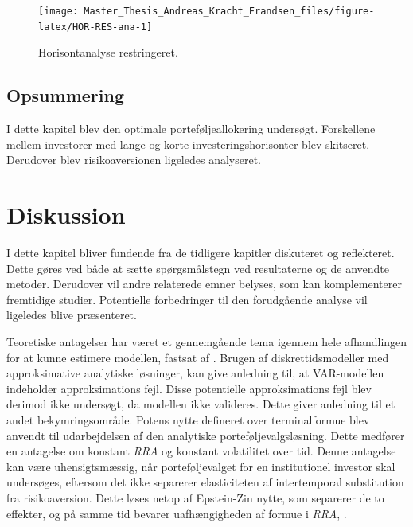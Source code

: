 \documentclass[
  a4paper,
  oneside]{memoir}
\begin{document}
\begin{figure}[H]

{\centering \texttt{[image: Master\_Thesis\_Andreas\_Kracht\_Frandsen\_files/figure-latex/HOR-RES-ana-1]} 

}

\caption{Horisontanalyse restringeret.}\label{fig:HOR-RES-ana}
\end{figure}

\hypertarget{opsummering-4}{%
\section{Opsummering}\label{opsummering-4}}

I dette kapitel blev den optimale porteføljeallokering undersøgt. Forskellene mellem investorer med lange og korte investeringshorisonter blev skitseret. Derudover blev risikoaversionen ligeledes analyseret.

\hypertarget{diskussion}{%
\chapter{Diskussion}\label{diskussion}}

I dette kapitel bliver fundende fra de tidligere kapitler diskuteret og reflekteret. Dette gøres ved både at sætte spørgsmålstegn ved resultaterne og de anvendte metoder. Derudover vil andre relaterede emner belyses, som kan komplementerer fremtidige studier. Potentielle forbedringer til den forudgående analyse vil ligeledes blive præsenteret.

Teoretiske antagelser har været et gennemgående tema igennem hele afhandlingen for at kunne estimere modellen, fastsat af \citep{JurVic2011}. Brugen af diskrettidsmodeller med approksimative analytiske løsninger, kan give anledning til, at VAR-modellen indeholder approksimations fejl. Disse potentielle approksimations fejl blev derimod ikke undersøgt, da modellen ikke valideres. Dette giver anledning til et andet bekymringsområde. Potens nytte defineret over terminalformue blev anvendt til udarbejdelsen af den analytiske porteføljevalgsløsning. Dette medfører en antagelse om konstant \emph{RRA} og konstant volatilitet over tid. Denne antagelse kan være uhensigtsmæssig, når porteføljevalget for en institutionel investor skal undersøges, eftersom det ikke separerer elasticiteten af intertemporal substitution fra risikoaversion. Dette løses netop af Epstein-Zin nytte, som separerer de to effekter, og på samme tid bevarer uafhængigheden af formue i \emph{RRA}, \citep{CampVicCha2003}.
\end{document}
